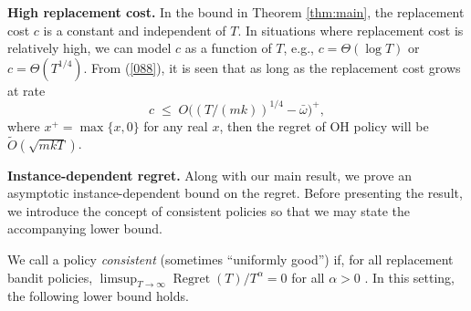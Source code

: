 \documentclass[opre,blindrev]{informs3}
\newcommand{\Regret}{\operatorname{Regret}}
\begin{document}
{\bf High replacement cost.} In the bound in Theorem \ref{thm:main}, the replacement cost $c$ is a constant and independent of $T$. In situations where replacement cost is relatively high, we can model $c$ as 
a function of $T$, e.g., $c=\Theta(\log T)$ or $c=\Theta(T^{1/4})$. From (\ref{088}), it is seen that as long as the replacement cost grows at rate  
$$c\;\le \; O\big((T/(mk))^{1/4}-\bar{\omega}\big)^+,$$ 
where $x^+=\max\{x, 0\}$ for any real $x$, then the regret of \textsc{OH} policy will be $\tilde O(\sqrt{mkT})$. 

{\bf Instance-dependent regret.} Along with our main result, we prove an asymptotic instance-dependent bound on the regret. Before presenting the result, we introduce the concept of consistent policies so that we may state the accompanying lower bound. 

We call a policy \emph{consistent} (sometimes ``uniformly good'') if, for all replacement bandit policies, \(\limsup_{T\to \infty}\Regret(T)/T^\alpha=0\) for all \(\alpha>0\) \citep{lattimore2020bandit}. In this setting, the following lower bound holds. 
\end{document}
